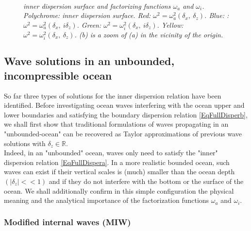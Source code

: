\documentclass[a4paper,11pt]{article}
\begin{document}
\begin{figure}[!h]
\begin{subfigure}{0.45\linewidth}
		\caption{}
	\end{subfigure}
	~
	\caption{\textit{inner dispersion surface and factorizing functions $\omega_a$ and $\omega_i$. Polychrome: inner dispersion surface. Red: $\omega^2=\omega_a^2(\delta_x,\ \delta_z)$. Blue: : $\omega^2=\omega_a^2(\delta_x,\ i \delta_z)$. Green: $\omega^2=\omega_i^2(\delta_x,\ i \delta_z)$. Yellow: $\omega^2=\omega_i^2(\delta_x,\ \delta_z)$. (b) is a zoom of (a) in the vicinity of the origin.}}
	\label{FigOmega}
\end{figure}

\subsection{Wave solutions in an unbounded, incompressible ocean}
\label{SubSectionUsualDisp}

So far three types of solutions for the inner dispersion relation have been identified. Before investigating ocean waves interfering with the ocean upper and lower boundaries and satisfying the boundary dispersion relation \ref{EqFullDisperb}, we shall first show that traditional formulations of waves propagating in an "unbounded-ocean" can be recovered as Taylor approximations of previous wave solutions with $\delta_z\in\mathbb{R}$.\\
Indeed, in an "unbounded" ocean, waves only need to satisfy the "inner" dispersion relation \ref{EqFullDispera}. In a more realistic bounded ocean, such waves can exist if their vertical scales is (much) smaller than the ocean depth $(|\delta_z| << 1)$ and if they do not interfere with the bottom or the surface of the ocean. 
We shall additionally confirm in this simple configuration the physical meaning and the analytical importance of the factorization functions $\omega_a$ and $\omega_i$. 


\subsubsection{Modified internal waves (MIW)}
\end{document}
